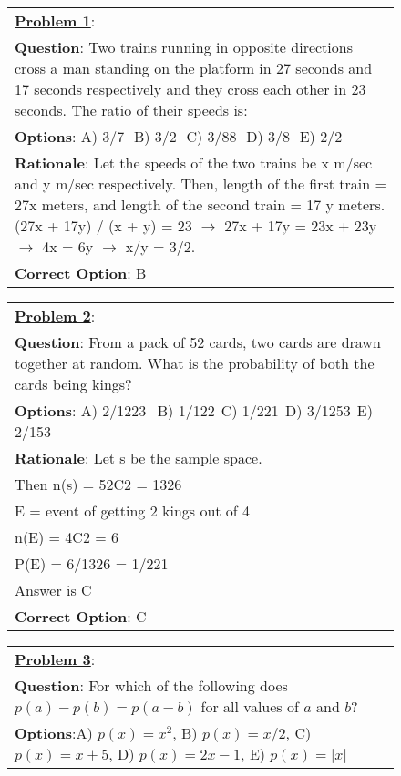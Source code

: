 \begin{figure}[t]
        {\fontsize{8.5}{9}\selectfont
        \hspace{-2mm}
        \begin{tabular}{|p{75mm}|}
        \hline
        \underline{\textbf{Problem 1}}:\\
        \textbf{Question}: Two trains running in opposite directions cross a man standing on the platform in 27 seconds and 17 seconds respectively and they cross each other in 23 seconds. The ratio of their speeds is:\\
		\textbf{Options}: A) 3/7$\ \ \ $B) 3/2$\ \ \ $C) 3/88$\ \ \ $D) 3/8$\ \ \ $E) 2/2 \\
		
        \textbf{Rationale}: Let the speeds of the two trains be x m/sec and y m/sec respectively. Then, length of the first train = 27x meters, and length of the second train = 17 y meters. (27x + 17y) / (x + y) = 23 $\rightarrow$ 27x + 17y = 23x + 23y $\rightarrow$ 4x = 6y $\rightarrow$ x/y = 3/2. \\
		\textbf{Correct Option}: B \\
        \hline
        
        \end{tabular}

		\hspace{-2mm}
        \begin{tabular}{|p{75mm}|}
        \hline
        \underline{\textbf{Problem 2}}:\\
        \textbf{Question}: From a pack of 52 cards, two cards are drawn together at random. What is the probability of both the cards being kings?\\
		\textbf{Options}: A) 2/1223$\ \ $ B) 1/122$\ \ $C) 1/221$\ \ $D) 3/1253$\ \ $E) 2/153 \\
		
        \textbf{Rationale}: Let s be the sample space.\\
		Then n(s) = 52C2 = 1326 \\
		E = event of getting 2 kings out of 4 \\
		n(E) = 4C2 = 6 \\
		P(E) = 6/1326 = 1/221 \\
		Answer is C \\
		\textbf{Correct Option}: C \\
        \hline
        \end{tabular}
		
		\hspace{-2mm}
        \begin{tabular}{|p{75mm}|}
        \hline
        \underline{\textbf{Problem 3}}:\\
        \textbf{Question}: For which of the following does $p(a)-p(b)=p(a-b)$ for all values of $a$ and $b$?\\
		\textbf{Options}:A) $p(x)=x^2$, B) $p(x)=x/2$, C) $p(x)=x+5$, D) $p(x)=2x−1$, E) $p(x)=|x|$ \\
		

\end{tabular}}
\end{figure}
